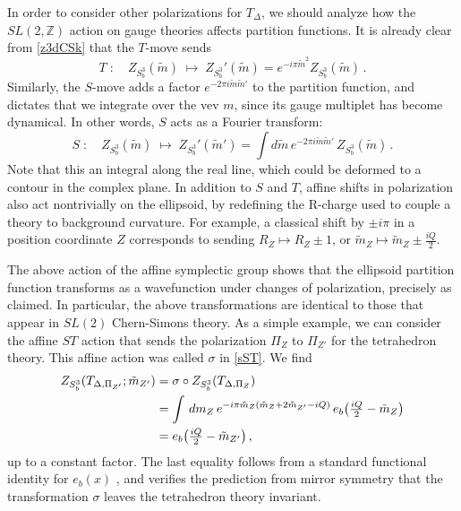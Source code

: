 \documentclass[hyper,letterpaper]{JHEP3}
\numberwithin{equation}{section}
\newcommand{\be}{\begin{equation}}
\newcommand{\ee}{\end{equation}}
\newcommand{\Z}{{\mathbb Z}}
\begin{document}
In order to consider other polarizations for $T_{\Delta}$, we should analyze how the $SL(2,\Z)$ action on gauge theories affects partition functions. It is already clear from \eqref{z3dCSk} that the $T$-move sends
%
\be T\;:\quad Z_{S^3_b}(\tilde m)\;\mapsto\; Z_{S^3_b}'(\tilde m)= e^{-i\pi \tilde m^2}Z_{S^3_b}(\tilde m)\,. \label{Z3T} \ee
%
Similarly, the $S$-move adds a factor $e^{-2\pi i \tilde m\tilde m'}$ to the partition function, and dictates that we integrate over the vev $m$, since its gauge multiplet has become dynamical. In other words, $S$ acts as a Fourier transform:
%
\be S\;:\quad Z_{S^3_b}(\tilde m)\;\mapsto\; Z_{S^3_b}'(\tilde m')=\int d\tilde m\, e^{-2\pi i \tilde m\tilde m'}\, Z_{S^3_b}(\tilde m)\,. \label{Z3S} \ee
%
Note that this an integral along the real line, which could be deformed to a contour in the complex plane. In addition to $S$ and $T$, affine shifts in polarization also act nontrivially on the ellipsoid, by redefining the R-charge used to couple a theory to background curvature.
For example, a classical shift by $\pm i\pi$ in a position coordinate $Z$ corresponds to sending $R_Z\mapsto R_Z\pm 1$, or $\tilde m_Z\mapsto \tilde m_Z\pm \tfrac{iQ}{2}$.



The above action of the affine symplectic group shows that the ellipsoid partition function transforms as a wavefunction under changes of polarization, precisely as claimed. In particular, the above transformations are identical to those that appear in $SL(2)$ Chern-Simons theory. As a simple example, we can consider the affine $ST$ action that sends the polarization $\Pi_Z$ to $\Pi_{Z'}$ for the tetrahedron theory. This affine action was called $\sigma$ in \eqref{sST}. We find
%
\begin{align} Z_{S^3_b}(T_{\Delta,\Pi_{Z'}};\tilde m_{Z'}) &=\sigma \circ Z_{S^3_b}(T_{\Delta,\Pi_Z}) \notag \\ &= \int\, dm_Z\,e^{-i\pi \tilde m_Z(\tilde m_Z+2\tilde m_{Z'}-iQ)}\,
e_b\big(\tfrac{iQ}{2}-\tilde m_Z\big)  \notag \\
&= e_b\big(\tfrac{iQ}{2}-\tilde m_{Z'}\big)\,, \label{STZDelta}
\end{align}
%
up to a constant factor.
The last equality follows from a standard functional identity for $e_b(x)$ \cite{FKV}, and verifies the prediction from mirror symmetry that the transformation $\sigma$ leaves the tetrahedron theory invariant.
\end{document}
